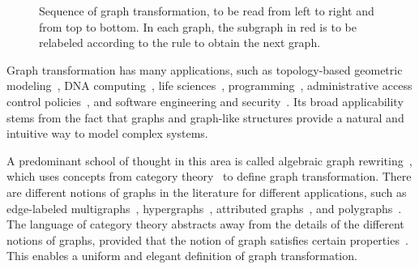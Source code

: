 \begin{figure}[H]
{
}
        \caption{Sequence of graph transformation, to be read from left to right and from top to bottom. In each graph, the subgraph in red is to be relabeled according to the rule to obtain the next graph.}
        \label{fig:intro_sequence_of_transformation}
    \end{figure}
 
 Graph transformation has many applications, such as topology-based geometric modeling~\cite{poudret2007topology,poudret2008graph_transformation, belhaouari2014jerboa, bellet2017geometric, pascale2022Geometric_modeling,arnould2022preserving_consistency}, DNA computing~\cite{harju2004tutorial_dna_computation}, life sciences~\cite{behr2021rewriting_life_sciences}, programming~\cite{plump2009graph_programming_language}, administrative access control policies~\cite{bertolissi2025category_based, bertolissi2021graph_based,koch2001specification_evolution_access_control}, and software engineering and security~\cite{heckel2020software_engineers}. Its broad applicability stems from the fact that graphs and graph-like structures provide a natural and intuitive way to model complex systems. 
 
 A predominant school of thought in this area is called algebraic graph rewriting~\cite{ehrig1997handbook1,ehrig1999handbook2,ehrig1999handbook3}, which uses concepts from category theory~\cite{pierce1991basic,barr1990category,maclane2013categories} to define graph transformation. 
 There are different notions of graphs in the literature for different applications, such as edge-labeled multigraphs~\cite{konig2018atutorial,corradini1997algebraic}, hypergraphs~\cite{plump1993hypergraph}, attributed graphs~\cite{ehrig2006fundamentals}, and polygraphs~\cite{ara2023polygraphs}.
 The language of category theory abstracts away from the details of the different notions of graphs, provided that the notion of graph satisfies certain properties~\cite{lack2004adhesive,overbeek2023graph}.  
This enables a uniform and elegant definition of graph transformation. 

